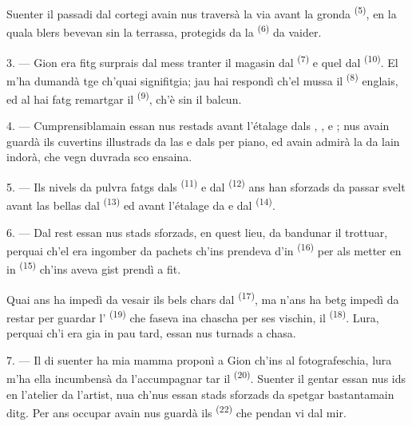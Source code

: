 Suenter il passadi dal cortegi avain nus traversà la via avant la gronda
 \textsuperscript{(5)}, en la quala blers  bevevan
 sin la terrassa, protegids da la  \textsuperscript{(6)} da
vaider.

3. --- Gion era fitg surprais dal  mess tranter il magasin dal
 \textsuperscript{(7)} e quel dal 
\textsuperscript{(10)}. El m'ha dumandà tge ch'quai signifitgia; jau hai respondì ch'el
mussa il  \textsuperscript{(8)} englais, ed al hai fatg remartgar il
 \textsuperscript{(9)}, ch'è sin il balcun.

\VUsaut{3.0mm}

4. --- Cumprensiblamain essan nus restads avant l'étalage dals , ,  e ; nus avain guardà ils
cuvertins illustrads da las  e dals  per piano,
ed avain admirà la  da lain indorà, che vegn duvrada sco ensaina.

5. --- Ils nivels da pulvra fatgs dals  \textsuperscript{(11)} e dal
 \textsuperscript{(12)} ans han sforzads da passar svelt avant las
bellas  dal  \textsuperscript{(13)} ed avant
l'étalage da  e  dal  \textsuperscript{(14)}.

6. --- Dal rest essan nus stads sforzads, en quest lieu, da bandunar il trottuar,
perquai ch'el era ingomber da pachets ch'ins prendeva d'in 
\textsuperscript{(16)} per als metter en in  \textsuperscript{(15)} ch'ins aveva
gist prendì a fit.

Quai ans ha impedì da vesair ils bels chars dal  \textsuperscript{(17)}, ma
n'ans ha betg impedì da restar per guardar l' \textsuperscript{(19)} che
faseva ina chascha per ses vischin, il 
\textsuperscript{(18)}. Lura, perquai ch'i era gia in pau tard, essan nus turnads a
chasa.

\VUsaut{3.0mm}

7. --- Il di suenter ha mia mamma proponì a Gion ch'ins al fotografeschia, lura m'ha
ella incumbensà da l'accumpagnar tar il  \textsuperscript{(20)}. Suenter il
gentar essan nus ids en l'atelier da l'artist, nua ch'nus essan stads sforzads da
spetgar bastantamain ditg. Per ans occupar avain nus guardà ils 
\textsuperscript{(22)} che pendan vi dal mir.

